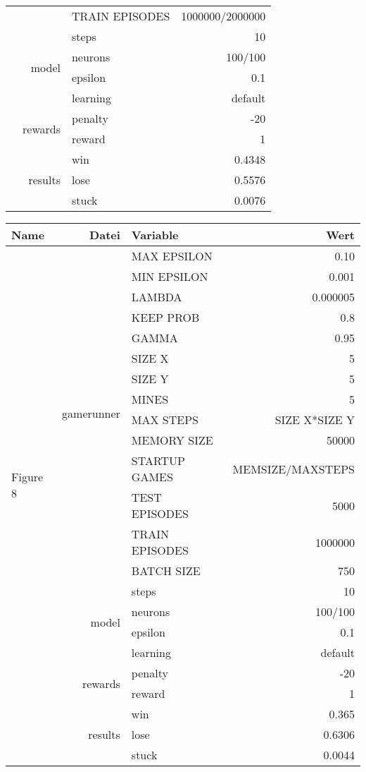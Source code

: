 \documentclass[9pt]{article}
\begin{document}
\begin{tabularx}{\textwidth}{l|r|X|r}
	& & TRAIN EPISODES & 1000000/2000000 \\
	& & steps & 10\\\cline{2-4}
	& \multirow{2}{*}{model} & neurons & 100/100 \\ 
	& & epsilon & 0.1\\
	& & learning & default \\\cline{2-4}
	& \multirow{2}{*}{rewards} & penalty & -20\\
	& & reward& 1\\\cline{2-4}
	& \multirow{3}{*}{results} & win & 0.4348 \\
	& & lose & 0.5576 \\
	& & stuck & 0.0076 \\
	\hline
\end{tabularx}

\begin{tabularx}{\textwidth}{l|r|X|r}
	Name & Datei & Variable & Wert \\
	\hline
	\multirow{21}{*}{Figure 8} & \multirow{14}{*}{gamerunner} & MAX EPSILON	& 0.10\\
	& & MIN EPSILON	& 0.001 \\
	& & LAMBDA & 0.000005 \\
	& & KEEP PROB & 0.8 \\
	& & GAMMA	& 0.95 \\
	& & SIZE X & 5 \\
	& & SIZE Y & 5 \\
	& & MINES & 5 \\
	& & MAX STEPS & SIZE X*SIZE Y\\
	& & MEMORY SIZE & 50000 \\
	& & STARTUP GAMES & MEMSIZE/MAXSTEPS \\
	& & TEST EPISODES & 5000 \\
	& & TRAIN EPISODES & 1000000 \\
	& & BATCH SIZE & 750 \\
	& & steps & 10\\\cline{2-4}
	& \multirow{2}{*}{model} & neurons & 100/100 \\ 
	& & epsilon & 0.1\\
	& & learning & default \\\cline{2-4}
	& \multirow{2}{*}{rewards} & penalty & -20\\
	& & reward & 1\\\cline{2-4}
	& \multirow{3}{*}{results} & win & 0.365\\
	& & lose & 0.6306\\
	& & stuck & 0.0044\\

\end{tabularx}
\end{document}
